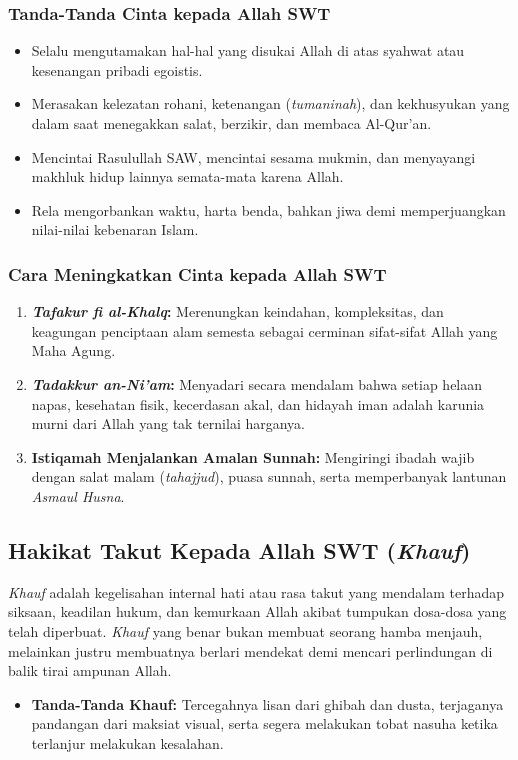 \documentclass[12pt, a4paper]{article}
\begin{document}
\subsubsection{Tanda-Tanda Cinta kepada Allah SWT}
\begin{itemize}
    \item Selalu mengutamakan hal-hal yang disukai Allah di atas syahwat atau kesenangan pribadi egoistis.
    \item Merasakan kelezatan rohani, ketenangan (\textit{tumaninah}), dan kekhusyukan yang dalam saat menegakkan salat, berzikir, dan membaca Al-Qur'an.
    \item Mencintai Rasulullah SAW, mencintai sesama mukmin, dan menyayangi makhluk hidup lainnya semata-mata karena Allah.
    \item Rela mengorbankan waktu, harta benda, bahkan jiwa demi memperjuangkan nilai-nilai kebenaran Islam.
\end{itemize}

\subsubsection{Cara Meningkatkan Cinta kepada Allah SWT}
\begin{enumerate}
    \item \textbf{\textit{Tafakur fi al-Khalq}:} Merenungkan keindahan, kompleksitas, dan keagungan penciptaan alam semesta sebagai cerminan sifat-sifat Allah yang Maha Agung.
    \item \textbf{\textit{Tadakkur an-Ni'am}:} Menyadari secara mendalam bahwa setiap helaan napas, kesehatan fisik, kecerdasan akal, dan hidayah iman adalah karunia murni dari Allah yang tak ternilai harganya.
    \item \textbf{Istiqamah Menjalankan Amalan Sunnah:} Mengiringi ibadah wajib dengan salat malam (\textit{tahajjud}), puasa sunnah, serta memperbanyak lantunan \textit{Asmaul Husna}.
\end{enumerate}

\subsection{Hakikat Takut Kepada Allah SWT (\textit{Khauf})}
\textit{Khauf} adalah kegelisahan internal hati atau rasa takut yang mendalam terhadap siksaan, keadilan hukum, dan kemurkaan Allah akibat tumpukan dosa-dosa yang telah diperbuat. \textit{Khauf} yang benar bukan membuat seorang hamba menjauh, melainkan justru membuatnya berlari mendekat demi mencari perlindungan di balik tirai ampunan Allah.
\begin{itemize}
    \item \textbf{Tanda-Tanda Khauf:} Tercegahnya lisan dari ghibah dan dusta, terjaganya pandangan dari maksiat visual, serta segera melakukan tobat nasuha ketika terlanjur melakukan kesalahan.
\end{itemize}
\end{document}
